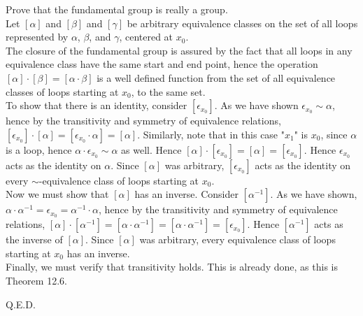 \documentclass{article}
\newcommand{\inv}[1]{#1^{-1}}
\newcommand{\inv}[1]{#1^{-1}}
\begin{document}
 Prove that the fundamental group is really a group.\\

 Let $[\alpha]$ and $[\beta]$ and $[\gamma]$ be arbitrary equivalence classes on the set of all loops represented by $\alpha $, $\beta$, and $\gamma$, centered at $x_0$.\\

The closure of the fundamental group is assured by the fact that all loops in any equivalence class have the same start and end point, hence the operation $[\alpha]\cdot[\beta] = [\alpha\cdot\beta]$ is a well defined function from the set of all equivalence classes of loops starting at $x_0$, to the same set.\\

To show that there is an identity, consider $[\epsilon_{x_0}]$. As we have shown $\epsilon_{x_0}\sim \alpha $, hence by the transitivity and symmetry of equivalence relations, $[\epsilon_{x_0}]\cdot [\alpha] = [\epsilon_{x_0}
\cdot \alpha] = [\alpha]$. Similarly, note that in this case "$x_1$" is $x_0$, since $\alpha$ is a loop, hence $\alpha\cdot \epsilon_{x_0}\sim \alpha$ as well. Hence $[\alpha]\cdot[\epsilon_{x_0}] = [\alpha] = [\epsilon_{x_0}]$. Hence $\epsilon_{x_0}$
 acts as the identity on $\alpha$. Since $[\alpha]$ was arbitrary, $[\epsilon_{x_0}]$ acts as the identity on every $\sim$-equivalence class of loops starting at $x_0$.\\
 
Now we must show that $[\alpha]$ has an inverse. Consider $ [\inv{\alpha}] $. As we have shown, $\alpha\cdot\inv{\alpha} = \epsilon_{x_0} = \inv{\alpha}\cdot \alpha$, hence by the transitivity and symmetry of equivalence relations, $[\alpha]\cdot[\inv{\alpha}] = [\alpha\cdot \inv{\alpha}] = [\alpha\cdot\inv{\alpha}] = [\epsilon_{x_0}]$. Hence $[\inv{\alpha}]$ acts as the inverse of $[\alpha]$. Since $[\alpha]$ was arbitrary, every equivalence class of loops starting at $x_0$ has an inverse.\\

Finally, we must verify that transitivity holds. This is already done, as this is Theorem 12.6.

Q.E.D.


 
\end{document}
